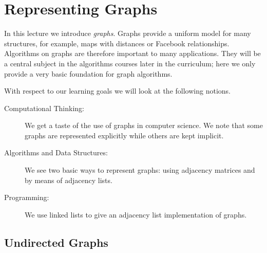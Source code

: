 \chapter{Representing Graphs}
\label{ch:graphs}

\newcommand{\lecnum}{23}
\newcommand{\lecturer}{Frank Pfenning, Andr\'e Platzer, Rob Simmons,\\
  Penny Anderson, Iliano Cervesato}

\maketitle

\begin{preamble}
\noindent
In this lecture we introduce \emph{graphs}.  Graphs provide a uniform
model for many structures, for example, maps with distances or
Facebook relationships.  Algorithms on graphs are therefore important
to many applications.  They will be a central subject in the
algorithms courses later in the curriculum; here we only provide a
very basic foundation for graph algorithms.
\end{preamble}

\begin{gram}
With respect to our learning goals we will look at the following
notions.
\begin{description}
\item[Computational Thinking: ]%
  We get a taste of the use of graphs in computer science.  We note that some
  graphs are represented explicitly while others are kept implicit.
\item[Algorithms and Data Structures: ]%
  We see two basic ways to represent graphs: using adjacency matrices and by
  means of adjacency lists.
\item[Programming: ]%
  We use linked lists to give an adjacency list implementation of graphs.
\end{description}
\end{gram}

\clearpage
\section{Undirected Graphs}
\label{sec:graphs:undirected_graphs}

